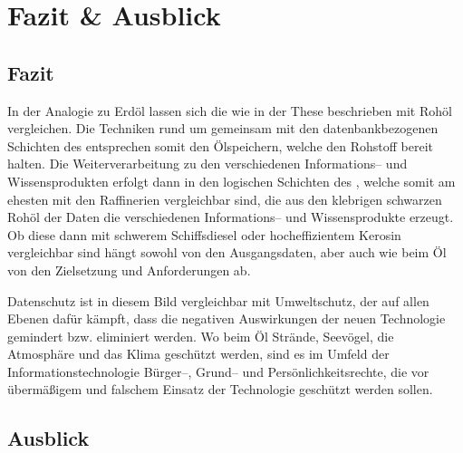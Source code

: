\section{Fazit \& Ausblick}

\subsection{Fazit}

In der Analogie zu Erdöl lassen sich die  wie in der These beschrieben mit Rohöl vergleichen. Die Techniken rund um  gemeinsam mit den datenbankbezogenen Schichten des  entsprechen somit den Ölspeichern, welche den Rohstoff bereit halten. Die Weiterverarbeitung zu den verschiedenen Informations-- und Wissensprodukten erfolgt dann in den logischen Schichten des , welche somit am ehesten mit den Raffinerien vergleichbar sind, die aus den klebrigen schwarzen Rohöl der Daten die verschiedenen Informations-- und Wissensprodukte erzeugt. Ob diese dann mit schwerem Schiffsdiesel oder hocheffizientem Kerosin vergleichbar sind hängt sowohl von den Ausgangsdaten, aber auch wie beim Öl von den Zielsetzung und Anforderungen ab.

Datenschutz ist in diesem Bild vergleichbar mit Umweltschutz, der auf allen Ebenen dafür kämpft, dass die negativen Auswirkungen der neuen Technologie gemindert bzw. eliminiert werden. Wo beim Öl Strände, Seevögel, die Atmosphäre und das Klima geschützt werden, sind es  im Umfeld der Informationstechnologie Bürger--, Grund-- und Persönlichkeitsrechte, die vor übermäßigem und falschem Einsatz der Technologie geschützt werden sollen.

\subsection{Ausblick}

